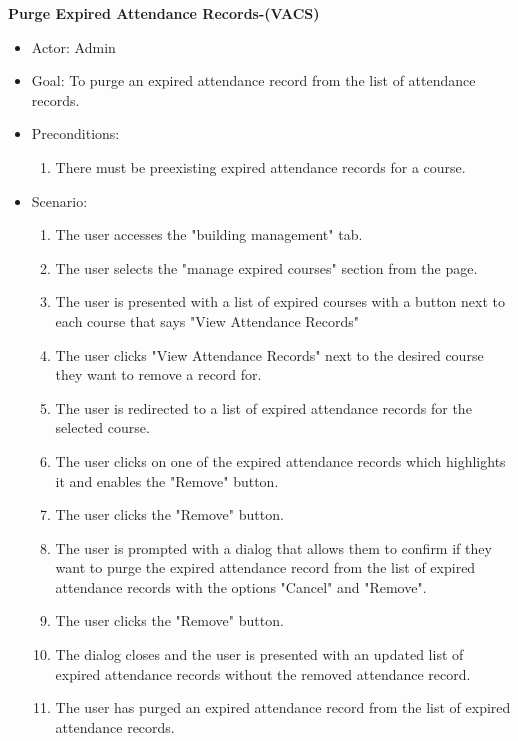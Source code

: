 \documentclass[letterpaper,12pt,oneside,listof=totoc]{scrreprt}
\begin{document}
\hfill \break
\textbf{Purge Expired Attendance Records-(VACS)}
\begin{itemize}
    \item Actor: Admin
    \item Goal: To purge an expired attendance record from the list of attendance records.
    \item Preconditions:
    \begin{enumerate}
        \item There must be preexisting expired attendance records for a course.
    \end{enumerate}
    \item Scenario:
    \begin{enumerate}
        \item The user accesses the "building management" tab.
        \item The user selects the "manage expired courses" section from the page.
        \item The user is presented with a list of expired courses with a button next to each course that says "View Attendance Records"
        \item The user clicks "View Attendance Records" next to the desired course they want to remove a record for.
        \item The user is redirected to a list of expired attendance records for the selected course.
        \item The user clicks on one of the expired attendance records which highlights it and enables the "Remove" button.
        \item The user clicks the "Remove" button.
        \item The user is prompted with a dialog that allows them to confirm if they want to purge the expired attendance record from the list of expired attendance records with the options "Cancel" and "Remove".
        \item The user clicks the "Remove" button.
        \item The dialog closes and the user is presented with an updated list of expired attendance records without the removed attendance record.
        \item The user has purged an expired attendance record from the list of expired attendance records.
    \end{enumerate}
\end{itemize}
\end{document}
